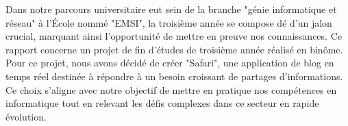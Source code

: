 





\label{chap:sectionone}
\vspace{1cm}\vspace{1cm}\vspace{1cm}\vspace{1cm}\vspace{1cm}

Dans notre parcours universitaire eut sein de la branche "génie informatique et réseau" à l'École nommé "EMSI", la troisième année se compose dé d'un jalon crucial, marquant ainsi l'opportunité de mettre en preuve nos connaissances.  Ce rapport concerne un projet de fin d'études de troisième année réalisé en binôme. \\ 

Pour ce projet, nous avons décidé de créer "Safari", une application de blog en temps réel destinée à répondre à un besoin croissant de partages d'informations.\\

Ce choix s'aligne avec notre objectif de mettre en pratique nos compétences en informatique tout en relevant les défis complexes dans ce secteur en rapide évolution. \\



